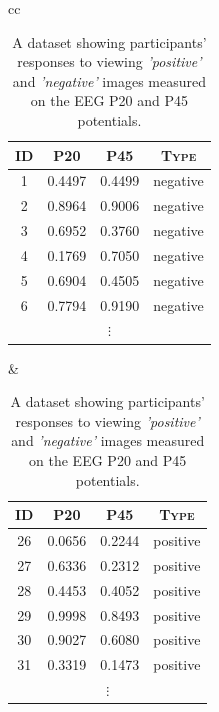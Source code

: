 \documentclass[xcolor={table}]{beamer}
\newcommand{\featN}[1]{\textsc{#1}}
\newcommand{\featL}[1]{\textit{'#1'}}
\begin{document}
 \begin{frame} 
\begin{table}[htb]
\caption{A dataset showing participants' responses to viewing \featL{positive} and \featL{negative} images measured on the EEG \featN{P20} and \featN{P45} potentials.}
\label{tab:eegDataset}
\centering
\begin{scriptsize}
\begin{tabular}{cc}
		\hline
			\begin{minipage}{0.42\textwidth}
					\begin{tabular}[ht]{ c c c c }
		\featN{ID} & \featN{P20} & \featN{P45} &  \featN{Type} \\		
		\hline
1	&	0.4497	&	0.4499	&	negative\\
2	&	0.8964	&	0.9006	&	negative\\
3	&	0.6952	&	0.3760	&	negative\\
4	&	0.1769	&	0.7050	&	negative\\
5	&	0.6904	&	0.4505	&	negative\\
6	&	0.7794	&	0.9190	&	negative\\
\multicolumn{4}{c}{$\vdots$}\\
		\hline
					\end{tabular}
			\end{minipage}
			&
			\begin{minipage}{0.42\textwidth}
										\begin{tabular}[ht]{ c c c c }
		\featN{ID} & \featN{P20} & \featN{P45} &  \featN{Type} \\		
		\hline
26	&	0.0656	&	0.2244	&	positive	\\
27	&	0.6336	&	0.2312	&	positive	\\
28	&	0.4453	&	0.4052	&	positive	\\
29	&	0.9998	&	0.8493	&	positive	\\
30	&	0.9027	&	0.6080	&	positive	\\
31	&	0.3319	&	0.1473	&	positive	\\
\multicolumn{4}{c}{$\vdots$}\\
\hline
				\end{tabular}
			\end{minipage}\\
\end{tabular}
\end{scriptsize}
\end{table}
\end{frame} 
\end{document}
